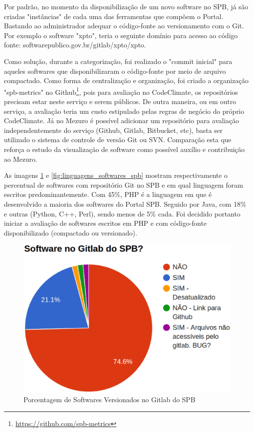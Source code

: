 Por padrão, no momento da disponibilização de um novo software no SPB, já são
criadas "instâncias" de cada uma das ferramentas que compõem o Portal. Bastando
ao administrador adequar o código-fonte ao versionamento com o Git. Por exemplo
o software "xpto", teria o seguinte domínio para acesso ao código fonte:
softwarepublico.gov.br/gitlab/xpto/xpto.

Como solução, durante a categorização, foi realizado o "commit inicial" para
aqueles softwares que disponibilizaram o código-fonte por meio de arquivo
compactado. Como forma de centralização e organização, foi criado a organização
"spb-metrics" no Github\footnote{\url{https://github.com/spb-metrics}}, pois
para avaliação no CodeClimate, os repositórios precisam estar neste serviço e
serem públicos. De outra maneira, ou em outro serviço, a avaliação teria um
custo estipulado pelas regras de negócio do próprio CodeClimate. Já no Mezuro é
possível adicionar um repositório para avaliação independentemente do serviço
(Github, Gitlab, Bitbucket, etc), basta ser utilizado o sistema de controle de
versão Git ou SVN. Comparação esta que reforça o estudo da visualização de
software como possível auxílio e contribuição ao Mezuro.

As imagens \ref{fig:is_software_gitlab_spb} e \ref{fig:linguagens_softwares_spb}
mostram respectivamente o percentual de softwares com repositório Git no SPB e
em qual linguagem foram escritos predominantemente. Com 45\%, PHP é a linguagem
em que é desenvolvido a maioria dos softwares do Portal SPB. Seguido por Java,
com 18\% e outras (Python, C++, Perl), sendo menos de 5\% cada. Foi decidido
portanto iniciar a avaliação de softwares escritos em PHP e com código-fonte
disponibilizado (compactado ou versionado).

\begin{figure}[!htb]
	\centering
    \includegraphics[keepaspectratio=true,scale=0.5]
    {figuras/is_software_gitlab_spb.eps}
  \caption{Porcentagem de Softwares Versionados no Gitlab do SPB}
  \label{fig:is_software_gitlab_spb}
\end{figure}

